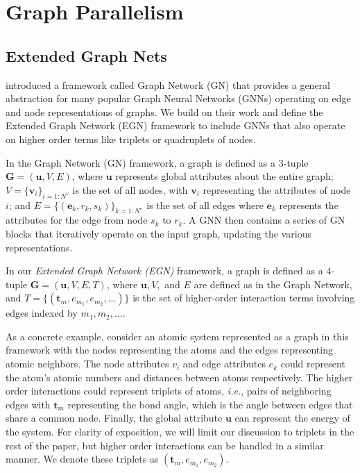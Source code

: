 \documentclass{article} \usepackage{iclr2022_conference,times}
\def\vv{{\bm{v}}}
\newcommand{\GGG}{\mathbf{G}}
\newcommand{\uu}{\mathbf{u}}
\newcommand{\ee}{\mathbf{e}}
\newcommand{\ttt}{\mathbf{t}}
\begin{document}
\section{Graph Parallelism}
\label{sec:graphparallel}

\subsection{Extended Graph Nets}
\label{sec:egn}

\cite{battaglia2018relational} introduced a framework called Graph Network (GN) that provides a general abstraction for many popular Graph Neural Networks (GNNs) operating on edge and node representations of graphs. We build on their work and define the Extended Graph Network (EGN) framework to include GNNs that also operate on higher order terms like triplets or quadruplets of nodes.

In the Graph Network (GN) framework, a graph is defined as a $3$-tuple $\GGG = (\uu, V, E)$, where $\uu$ represents global attributes about the entire graph; $V = \{\vv_i\}_{i=1:N^v}$ is the set of all nodes, with $\vv_i$ representing the attributes of node $i$; and $E = \{(\ee_k, r_k, s_k)\}_{k=1:N^e}$ is the set of all edges where $\ee_k$ represents the attributes for the edge from node $s_k$ to $r_k$. A GNN then contains a series of GN blocks
that iteratively operate on the input graph, updating the various representations.

In our \emph{Extended Graph Network (EGN)} framework, a graph is defined as a $4$-tuple $\GGG = (\uu, V, E, T)$, where $\uu, V,$ and $E$ are defined as in the Graph Network, and $T = \{(\ttt_m, e_{m_1}, e_{m_2}, \ldots)\}$ is the set of higher-order interaction terms involving edges indexed by $m_1, m_2, \ldots$.

As a concrete example, consider an atomic system represented as a graph in this framework with the nodes representing the atoms and the edges representing atomic neighbors. The node attributes $v_i$ and edge attributes $e_k$ could represent the atom's atomic numbers and distances between atoms respectively. The higher order interactions could represent triplets of atoms, \textit{i.e.}, pairs of neighboring edges with $\ttt_m$ representing the bond angle, which is the angle between edges that share a common node.
Finally, the global attribute $\uu$
can represent the energy of the system. For clarity of exposition, we will limit our discussion to triplets in the rest of the paper, but higher order interactions can be handled in a similar manner. We denote these triplets as $(\ttt_m, e_{m_1}, e_{m_2})$.
\end{document}
